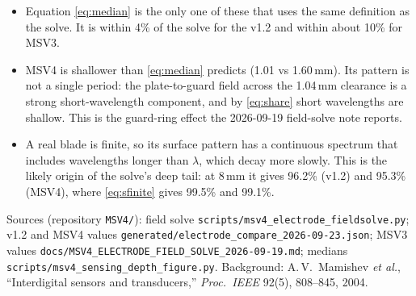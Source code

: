 \documentclass[11pt,letterpaper]{article}
\begin{document}
\begin{itemize}[leftmargin=1.4em]
  \item Equation \eqref{eq:median} is the only one of these that uses the same definition as the solve.
        It is within 4\% of the solve for the v1.2 and within about 10\% for MSV3.
  \item MSV4 is shallower than \eqref{eq:median} predicts (1.01 vs 1.60\,mm). Its pattern is not a single
        period: the plate-to-guard field across the 1.04\,mm clearance is a strong short-wavelength
        component, and by \eqref{eq:share} short wavelengths are shallow. This is the guard-ring effect
        the 2026-09-19 field-solve note reports.
  \item A real blade is finite, so its surface pattern has a continuous spectrum that includes
        wavelengths longer than $\lambda$, which decay more slowly. This is the likely origin of the
        solve's deep tail: at 8\,mm it gives 96.2\% (v1.2) and 95.3\% (MSV4), where
        \eqref{eq:sfinite} gives 99.5\% and 99.1\%.
\end{itemize}

\vspace{8pt}
{\footnotesize\color{inkgray}\raggedright\noindent
Sources (repository \texttt{MSV4/}): field solve \texttt{scripts/msv4\_electrode\_fieldsolve.py}; v1.2 and
MSV4 values \texttt{generated/electrode\_compare\_2026-09-23.json}; MSV3 values
\texttt{docs/MSV4\_ELECTRODE\_FIELD\_SOLVE\_2026-09-19.md}; medians
\texttt{scripts/msv4\_sensing\_depth\_figure.py}. Background: A.\,V.~Mamishev \emph{et al.},
``Interdigital sensors and transducers,'' \emph{Proc.\ IEEE} 92(5), 808--845, 2004.\par}
\end{document}
